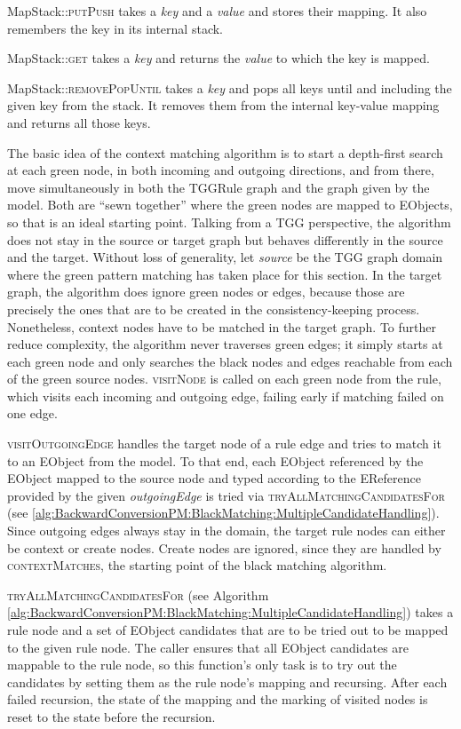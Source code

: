 MapStack::\textsc{putPush} takes a \emph{key} and a \emph{value} and stores their mapping. It also remembers the key in its internal stack.

MapStack::\textsc{get} takes a \emph{key} and returns the \emph{value} to which the key is mapped.

MapStack::\textsc{removePopUntil} takes a \emph{key} and pops all keys until and including the given key from the stack. It removes them from the internal key-value mapping and returns all those keys.

The basic idea of the context matching algorithm is to start a depth-first search at each green node, in both incoming and outgoing directions,
and from there, move simultaneously in both the TGGRule graph and the graph given by the model.
Both are \enquote{sewn together} where the green nodes are mapped to EObjects, so that is an ideal starting point.
Talking from a TGG perspective, the algorithm does not stay in the source or target graph but behaves differently in the source and the target.
Without loss of generality, let \emph{source} be the TGG graph domain where the green pattern matching has taken place for this section.
In the target graph, the algorithm does ignore green nodes or edges, because those are precisely the ones that are to be created in the consistency-keeping process.
Nonetheless, context nodes have to be matched in the target graph.
To further reduce complexity, the algorithm never traverses green edges; it simply starts at each green node and only searches the black nodes and edges reachable from each of the green source nodes.
\textsc{visitNode} is called on each green node from the rule, which visits each incoming and outgoing edge, failing early if matching failed on one edge.


\textsc{visitOutgoingEdge} handles the target node of a rule edge and tries to match it to an EObject from the model. To that end, each EObject referenced by the EObject mapped to the source node and typed according to the EReference provided by the given \emph{outgoingEdge} is tried via \textsc{tryAllMatchingCandidatesFor} (see \autoref{alg:BackwardConversionPM:BlackMatching:MultipleCandidateHandling}).
Since outgoing edges always stay in the domain, the target rule nodes can either be context or create nodes. Create nodes are ignored, since they are handled by \textsc{contextMatches}, the starting point of the black matching algorithm.

\textsc{tryAllMatchingCandidatesFor} (see Algorithm \autoref{alg:BackwardConversionPM:BlackMatching:MultipleCandidateHandling}) takes a rule node and a set of EObject candidates that are to be tried out to be mapped to the given rule node.
The caller ensures that all EObject candidates are mappable to the rule node, so this function's only task is to try out the candidates by setting them as the rule node's mapping and recursing.
After each failed recursion, the state of the mapping and the marking of visited nodes is reset to the state before the recursion.

